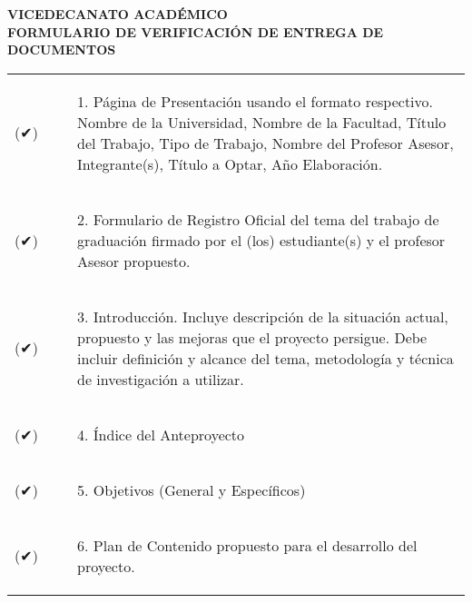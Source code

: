 \newpage
{}
{\bfseries \centering
\Universidad \\
\Facultad \\
VICEDECANATO ACADÉMICO \\
FORMULARIO DE VERIFICACIÓN DE ENTREGA DE DOCUMENTOS}

\vfill
{
\renewcommand{\arraystretch}{1.7}
\begin{tabularx}{\textwidth}{sb} %
  (✔) & \begin{enumerate} \item[1.] Página de Presentación usando el formato respectivo. Nombre de la Universidad, Nombre de la Facultad, Título del Trabajo, Tipo de Trabajo, Nombre del Profesor Asesor, Integrante(s), Título a Optar, Año Elaboración. \end{enumerate} \\
  (✔) & \begin{enumerate} \item[2.] Formulario de Registro Oficial del tema del trabajo de graduación firmado por el (los) estudiante(s) y el profesor Asesor propuesto. \end{enumerate} \\
  (✔) & \begin{enumerate} \item[3.] Introducción. Incluye descripción de la situación actual, propuesto y las mejoras que el proyecto persigue. Debe incluir definición y alcance del tema, metodología y técnica de investigación a utilizar. \end{enumerate} \\
  (✔) & \begin{enumerate} \item[4.] Índice del Anteproyecto \end{enumerate} \\
  (✔) & \begin{enumerate} \item[5.] Objetivos (General y Específicos) \end{enumerate} \\
  (✔) & \begin{enumerate} \item[6.] Plan de Contenido propuesto para el desarrollo del proyecto. \end{enumerate} \\

\end{tabularx}}
